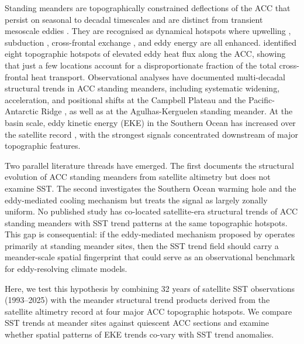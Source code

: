 \documentclass[draft]{agujournal2019}
\begin{document}
Standing meanders are topographically constrained deflections of the ACC that persist on seasonal to decadal timescales and are distinct from transient mesoscale eddies \cite{chapman2017new,chapman2020defining}.
They are recognised as dynamical hotspots where upwelling \cite{dove2021observational, yung2022topographic}, subduction \cite{dove2022enhanced}, cross-frontal exchange \cite{langlais2011variability,thompson2012jets}, and eddy energy \cite{chapman2015dynamics, foppert2017eddy} are all enhanced.
 identified eight topographic hotspots of elevated eddy heat flux along the ACC, showing that just a few locations account for a disproportionate fraction of the total cross-frontal heat transport.
Observational analyses have documented multi-decadal structural trends in ACC standing meanders, including systematic widening, acceleration, and positional shifts at the Campbell Plateau \cite{liu2024characteristics} and the Pacific-Antarctic Ridge \cite{liu2026standing}, as well as at the Agulhas-Kerguelen standing meander.
At the basin scale, eddy kinetic energy (EKE) in the Southern Ocean has increased over the satellite record \cite{hogg2015recent, martinez2021global, zhang2021regional}, with the strongest signals concentrated downstream of major topographic features.


Two parallel literature threads have emerged.
The first documents the structural evolution of ACC standing meanders from satellite altimetry but does not examine SST.
The second investigates the Southern Ocean warming hole and the eddy-mediated cooling mechanism but treats the signal as largely zonally uniform.
No published study has co-located satellite-era structural trends of ACC standing meanders with SST trend patterns at the same topographic hotspots.
This gap is consequential: if the eddy-mediated mechanism proposed by  operates primarily at standing meander sites, then the SST trend field should carry a meander-scale spatial fingerprint that could serve as an observational benchmark for eddy-resolving climate models.


Here, we test this hypothesis by combining 32 years of satellite SST observations (1993--2025) with the meander structural trend products derived from the satellite altimetry record at four major ACC topographic hotspots.
We compare SST trends at meander sites against quiescent ACC sections and examine whether spatial patterns of EKE trends co-vary with SST trend anomalies.
\end{document}
